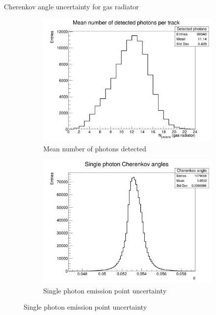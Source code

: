 \documentclass{beamer}
\begin{document}
\begin{frame}{Cherenkov angle uncertainty for gas radiator}
  \begin{figure}
    \centering
    \vspace{-0.2cm}
    \begin{subfigure}{0.35\textwidth}
      \includegraphics[width = 1.0\textwidth]{Plots/NumberDetectedPhotons_Barrel_Gas.png}
      \caption{Mean number of photons detected}
    \end{subfigure}
    \begin{subfigure}{0.35\textwidth}
      \includegraphics[width = 1.0\textwidth]{Plots/SinglePhotonCherenkovAngles_Barrel_Gas.png}
      \caption{Single photon emission point uncertainty}
    \end{subfigure}%

\end{figure}
\end{frame}
\end{document}

